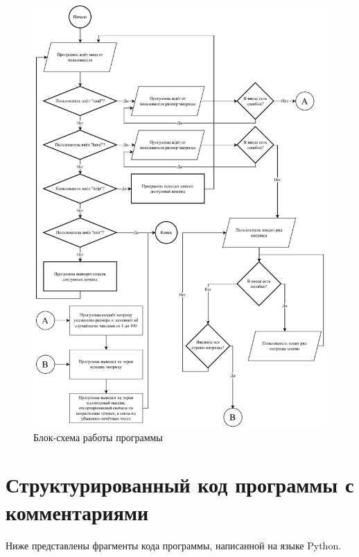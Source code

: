 \documentclass{mirea}
\begin{document}
\begin{figure}[ht]
	\centering
	\includegraphics[width=\textwidth]{Блок-схема.pdf}
	\caption{Блок-схема работы программы}
	\label{fig:Блок-схема}
\end{figure}

\section{Структурированный код программы с комментариями}
Ниже представлены фрагменты кода программы, написанной на языке Python.
\end{document}
